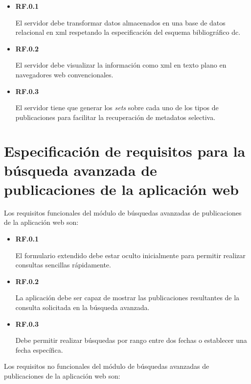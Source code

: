 \begin{itemize}
	\item \textbf{RF.0.1}

	El servidor debe transformar datos almacenados en una base de datos relacional en \acrshort{xml} respetando la especificación del esquema bibliográfico \acrshort{dc}.

	\item \textbf{RF.0.2}

	El servidor debe visualizar la información como \acrshort{xml} en texto plano en navegadores web convencionales.

	\item \textbf{RF.0.3}

	El servidor tiene que generar los \textit{sets} sobre cada uno de los tipos de publicaciones para facilitar la recuperación de metadatos selectiva.	
\end{itemize}


\section{Especificación de requisitos para la búsqueda avanzada de publicaciones de la aplicación web}

Los requisitos funcionales del módulo de búsquedas avanzadas de publicaciones de la aplicación web son:

\begin{itemize}
	\item \textbf{RF.0.1}

	El formulario extendido debe estar oculto inicialmente para permitir realizar consultas sencillas rápidamente.

	\item \textbf{RF.0.2}

	La aplicación debe ser capaz de mostrar las publicaciones resultantes de la consulta solicitada en la búsqueda avanzada.

	\item \textbf{RF.0.3}

	Debe permitir realizar búsquedas por rango entre dos fechas o establecer una fecha específica.
	
\end{itemize}

Los requisitos no funcionales del módulo de búsquedas avanzadas de publicaciones de la aplicación web son:

